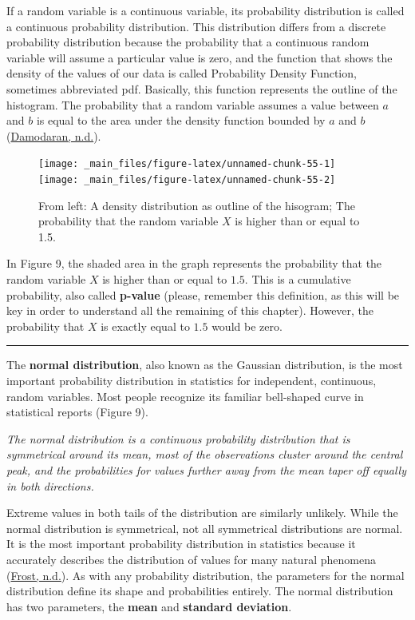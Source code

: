 \documentclass[
]{article}
\begin{document}
If a random variable is a continuous variable, its probability
distribution is called a continuous probability distribution. This
distribution differs from a discrete probability distribution because
the probability that a continuous random variable will assume a
particular value is zero, and the function that shows the density of the
values of our data is called Probability Density Function, sometimes
abbreviated pdf. Basically, this function represents the outline of the
histogram. The probability that a random variable assumes a value
between \(a\) and \(b\) is equal to the area under the density function
bounded by \(a\) and \(b\) (\protect\hyperlink{ref-damodaran}{Damodaran, n.d.}).

\begin{figure}[H]
\texttt{[image: \_main\_files/figure-latex/unnamed-chunk-55-1]} \texttt{[image: \_main\_files/figure-latex/unnamed-chunk-55-2]} \caption{From left: A density distribution as outline of the hisogram; The probability that the random variable $X$ is higher than or equal to 1.5.}\label{fig:unnamed-chunk-55}
\end{figure}

In Figure 9, the shaded area in the graph represents the probability
that the random variable \(X\) is higher than or equal to \(1.5\). This is a
cumulative probability, also called \textbf{p-value} (please, remember this
definition, as this will be key in order to understand all the remaining
of this chapter). However, the probability that \(X\) is exactly equal to
\(1.5\) would be zero.

\begin{center}\rule{0.5\linewidth}{0.5pt}\end{center}

The \textbf{normal distribution}, also known as the Gaussian distribution, is
the most important probability distribution in statistics for
independent, continuous, random variables. Most people recognize its
familiar bell-shaped curve in statistical reports (Figure 9).

\emph{The normal distribution is a continuous probability distribution that
is symmetrical around its mean, most of the observations cluster around
the central peak, and the probabilities for values further away from the
mean taper off equally in both directions.}

Extreme values in both tails of the distribution are similarly unlikely.
While the normal distribution is symmetrical, not all symmetrical
distributions are normal. It is the most important probability
distribution in statistics because it accurately describes the
distribution of values for many natural phenomena (\protect\hyperlink{ref-frost}{Frost, n.d.}). As with any
probability distribution, the parameters for the normal distribution
define its shape and probabilities entirely. The normal distribution has
two parameters, the \textbf{mean} and \textbf{standard deviation}.
\end{document}

